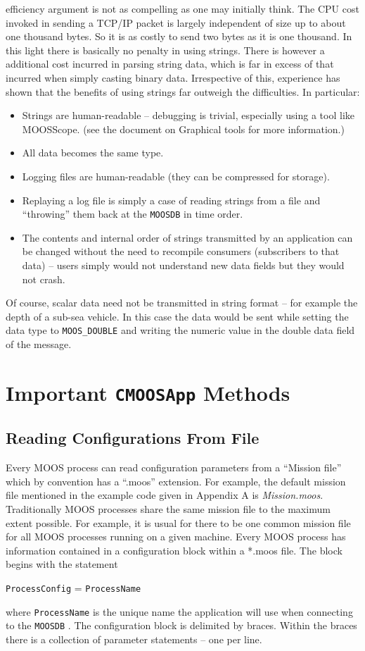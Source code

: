 \documentclass[a4paper,10pt]{article}
\newcommand{\Code}[1]{\texttt{#1} }
\newcommand{\code}[1]{\Code{#1} }
\newcommand{\DB}   {\code{{MOOSDB}}}
\begin{document}
efficiency argument is not as compelling as one may initially
think. The CPU cost invoked in sending a TCP/IP packet is largely
independent of size up to about one thousand bytes. So it is as
costly to send two bytes as it is one thousand. In this light
there is basically no penalty in using strings. There is however a
additional cost incurred in parsing string data, which is far in
excess of that incurred when simply casting binary data.
Irrespective of this, experience has shown that the benefits of
using strings far outweigh the difficulties. In particular:
\begin{itemize}
\item Strings are human-readable -- debugging is trivial, especially
using a tool like MOOSScope. (see the document on Graphical tools for more information.)
\item All data becomes the same type.
\item Logging files are human-readable (they can be compressed for
storage).
\item Replaying a log file is simply a case of reading strings from
a file and ``throwing'' them back at the \DB in time order.
\item The contents and internal order of strings transmitted by an application can be changed
without the need to recompile consumers (subscribers to that data)
-- users simply would not understand new data fields but they would
not crash.
\end{itemize}
Of course, scalar data need not be transmitted in string format --
for example the depth of a sub-sea vehicle. In this case the data
would be sent while setting the data type to  \verb"MOOS_DOUBLE"
and writing the numeric value in the double data field of the
message.


\section{Important \code{CMOOSApp} Methods}


\subsection{Reading Configurations From File}\label{Sec:App:Configuration}

Every MOOS process can read configuration parameters from a
``Mission file'' which by convention has a ``.moos'' extension.
For example, the default mission file mentioned in the example code
given in Appendix A is {\it{Mission.moos}}. Traditionally MOOS
processes share  the same mission file to the maximum extent
possible. For example, it is usual for there to be one common
mission file for all MOOS processes running on a given machine.
Every MOOS process has information contained in a configuration
block within a *.moos file. The block begins with the statement
\begin{center}
\code{ProcessConfig} = \code{ProcessName}
\end{center}
where {\code{ProcessName}} is the unique name the application will
use when connecting to the \DB. The configuration block is
delimited by braces. Within the braces there is a collection of
parameter statements -- one per line.
\end{document}
